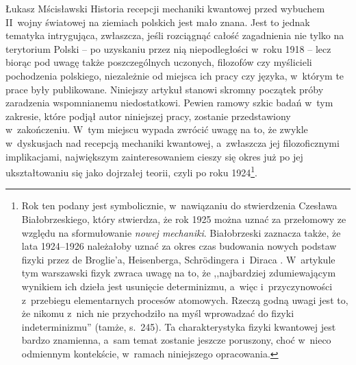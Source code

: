 \begin{artplenv}{Łukasz Mścisławski}
\lettrine[loversize=0.13,lines=2,lraise=-0.01,nindent=0em,findent=0.2pt]%
{H}{}istoria recepcji mechaniki kwantowej przed wybuchem II~wojny światowej na ziemiach polskich jest mało znana. Jest to jednak tematyka intrygująca, zwłaszcza, jeśli rozciągnąć całość zagadnienia nie tylko na terytorium Polski -- po uzyskaniu przez nią niepodległości w~roku 1918 -- lecz biorąc pod uwagę także poszczególnych uczonych, filozofów czy myślicieli pochodzenia polskiego, niezależnie od miejsca ich pracy czy języka, w~którym te prace były publikowane. Niniejszy artykuł stanowi skromny początek próby zaradzenia wspomnianemu niedostatkowi. Pewien ramowy szkic badań w~tym zakresie, które podjął autor niniejszej pracy, zostanie przedstawiony w~zakończeniu. W~tym miejscu wypada zwrócić uwagę na to, że zwykle w~dyskusjach nad recepcją mechaniki kwantowej, a~zwłaszcza jej filozoficznymi implikacjami, największym zainteresowaniem cieszy się okres już po jej ukształtowaniu się jako dojrzałej teorii, czyli po roku 1924\footnote{Rok ten podany jest symbolicznie, w~nawiązaniu do stwierdzenia Czesława Białobrzeskiego, który stwierdza, że rok 1925 można uznać za przełomowy ze względu na sformułowanie \textit{nowej mechaniki}. Białobrzeski zaznacza także, że lata 1924--1926 należałoby uznać za okres czas budowania nowych podstaw fizyki przez de Broglie'a, Heisenberga, Schrödingera i~Diraca
\parencite[por.][s.~244–245]{bialobrzeski_ogolnonaukowe_1937}. %
 W~artykule tym warszawski fizyk zwraca uwagę na to, że ,,najbardziej zdumiewającym wynikiem ich dzieła jest usunięcie determinizmu, a~więc i~przyczynowości z~przebiegu elementarnych procesów atomowych. Rzeczą godną uwagi jest to, że nikomu z~nich nie przychodziło na myśl wprowadzać do fizyki indeterminizmu'' (tamże, s.~245). Ta charakterystyka fizyki kwantowej jest bardzo znamienna, a~sam temat zostanie jeszcze poruszony, choć w~nieco odmiennym kontekście, w~ramach niniejszego opracowania.}.


\end{artplenv}
